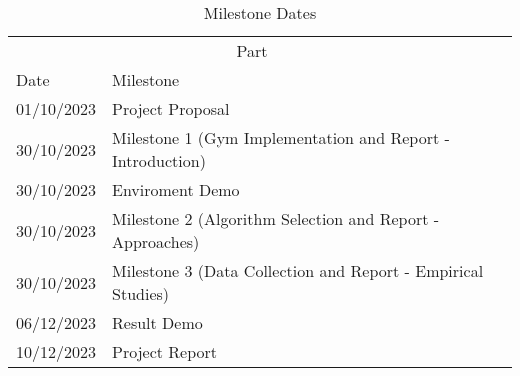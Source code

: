 \documentclass[../proposal.tex]{subfiles}
\begin{document}
\begin{table}
    \caption{Milestone Dates}
    \label{dates-table}
    \centering
    \begin{tabular}{lll}
        \toprule
        \multicolumn{2}{c}{Part}                                                              \\
        \cmidrule(r){1-2}
        Date     & Milestone                                                                  \\
        \midrule
        01/10/2023 & Project Proposal                                                         \\
        30/10/2023 & Milestone 1 (Gym Implementation and Report - Introduction)               \\
        30/10/2023 & Enviroment Demo                                                          \\
        30/10/2023 & Milestone 2 (Algorithm Selection and Report - Approaches)                \\
        30/10/2023 & Milestone 3 (Data Collection and Report - Empirical Studies)             \\
        06/12/2023 & Result Demo                                                              \\
        10/12/2023 & Project Report                                                           \\
        \bottomrule
    \end{tabular}
\end{table}
  
\end{document}

